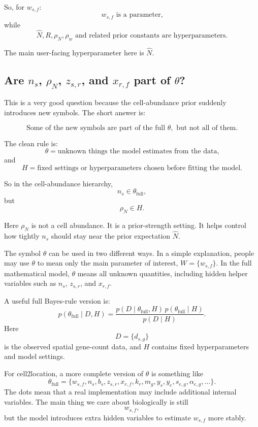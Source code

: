 \documentclass[11pt]{article}
\begin{document}
So, for $w_{s,f}$:
\[
w_{s,f}\text{ is a parameter,}
\]
while
\[
\hat N, R, \rho_N, \rho_w\text{ and related prior constants are hyperparameters.}
\]

The main user-facing hyperparameter here is $\hat N$.

\subsection{Are $n_s$, $\rho_N$, $z_{s,r}$, and $x_{r,f}$ part of $\theta$?}

This is a very good question because the cell-abundance prior suddenly introduces new symbols. The short answer is:

\[
\boxed{\text{Some of the new symbols are part of the full }\theta,\text{ but not all of them.}}
\]

The clean rule is:
\[
\theta=\text{unknown things the model estimates from the data,}
\]
and
\[
H=\text{fixed settings or hyperparameters chosen before fitting the model.}
\]

So in the cell-abundance hierarchy,
\[
n_s\in \theta_{\mathrm{full}},
\]
but
\[
\rho_N\in H.
\]

Here $\rho_N$ is not a cell abundance. It is a prior-strength setting. It helps control how tightly $n_s$ should stay near the prior expectation $\hat N$.

\begin{warningbox}
The symbol $\theta$ can be used in two different ways. In a simple explanation, people may use $\theta$ to mean only the main parameter of interest, $W=\{w_{s,f}\}$. In the full mathematical model, $\theta$ means all unknown quantities, including hidden helper variables such as $n_s$, $z_{s,r}$, and $x_{r,f}$.
\end{warningbox}

A useful full Bayes-rule version is:
\[
p(\theta_{\mathrm{full}}\mid D,H)
=
\frac{p(D\mid \theta_{\mathrm{full}},H)\,p(\theta_{\mathrm{full}}\mid H)}{p(D\mid H)}.
\]
Here
\[
D=\{d_{s,g}\}
\]
is the observed spatial gene-count data, and $H$ contains fixed hyperparameters and model settings.

For cell2location, a more complete version of $\theta$ is something like
\[
\theta_{\mathrm{full}}
=
\{w_{s,f}, n_s, b_s, z_{s,r}, x_{r,f}, k_r,
 m_g, y_s, y_e, s_{e,g}, \alpha_{e,g},\ldots\}.
\]
The dots mean that a real implementation may include additional internal variables. The main thing we care about biologically is still
\[
w_{s,f},
\]
but the model introduces extra hidden variables to estimate $w_{s,f}$ more stably.
\end{document}
